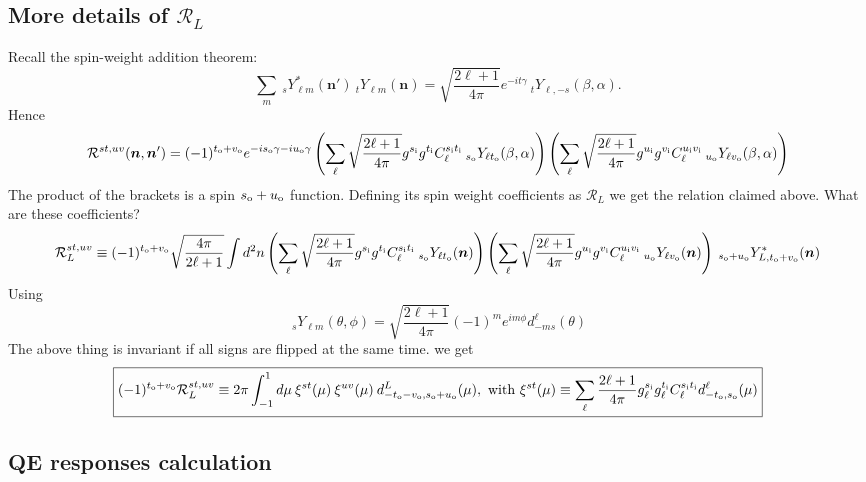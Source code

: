 \documentclass[reprint,prd, superscriptaddress, tightenlines, longbibliography, nofootinbib, eqsecnum, amsfonts, amsmath, floatfix, notitlepage, onecolumn]{revtex4-1}
\newcommand{\si}[0]{{s_{\rm i}}}
\newcommand{\ti}[0]{{t_{\rm i}}}
\newcommand{\ui}[0]{{u_{\rm i}}}
\newcommand{\vi}[0]{{v_{\rm i}}}
\newcommand{\so}[0]{{s_{\rm o}}}
\renewcommand{\to}[0]{{t_{\rm o}}}
\newcommand{\uo}[0]{{u_{\rm o}}}
\newcommand{\vo}[0]{{v_{\rm o}}}
\newcommand{\Ylm}[1]{\:_{#1}Y_{\ell m}}
\newcommand{\Ylms}[1]{\:_{#1}Y^*_{\ell m}}
\newcommand{\hn}[0]{\boldsymbol{n}}
\begin{document}
\subsection*{More details of $\mathcal R_L$}
Recall the spin-weight addition theorem:
\begin{equation}
	\sum_m \Ylms {s}(\hn') \Ylm {t} (\hn) =\sqrt{\frac{2\ell + 1}{4\pi}} e^{- i t \gamma} \:_t Y_{\ell, -s}(\beta, \alpha).
\end{equation}
Hence 
\begin{equation}
	\mathcal R^{st,uv}(\hn, \hn') = (-1)^{\to + \vo} e^{-i \so \gamma -i \uo \gamma} \left(\sum_\ell \sqrt{\frac{2\ell + 1}{4\pi}} g^{\si}g^{\ti} C_\ell^{\si \ti} \:_{\so}Y_{\ell \to}(\beta ,\alpha)\right) \left(\sum_\ell \sqrt{\frac{2\ell + 1}{4\pi}} g^{\ui}g^{\vi} C_\ell^{\ui \vi} \:_{\uo}Y_{\ell \vo}(\beta ,\alpha)\right)
\end{equation}
The product of the brackets is a spin $\so + \uo$ function. Defining its spin weight coefficients as $\mathcal R_L$ we get the relation claimed above. What are these coefficients? 
\begin{equation}
	\mathcal R_L^{st,uv} \equiv(-1)^{\to + \vo} \sqrt{\frac {4\pi}{2\ell + 1}} \int d^2n \left(\sum_\ell \sqrt{\frac{2\ell + 1}{4\pi}} g^{\si}g^{\ti} C_\ell^{\si \ti} \:_{\so}Y_{\ell \to}(\hn)\right) \left(\sum_\ell \sqrt{\frac{2\ell + 1}{4\pi}} g^{\ui}g^{\vi} C_\ell^{\ui \vi} \:_{\uo}Y_{\ell \vo}(\hn)\right)\:_{\so + \uo}Y^*_{L,\to + \vo}(\hn) 
\end{equation}
Using
\begin{equation}
	\boxed{\Ylm s(\theta, \phi) = \sqrt{\frac {2\ell + 1} {4\pi}}(-1)^m e^{i m \phi} d_{-m s}^\ell(\theta) }
\end{equation}
The above thing is invariant if all signs are flipped at the same time.
we get
\begin{equation}
\boxed{
(-1)^{\to + \vo} \mathcal R_L^{st,uv} \equiv 2\pi  \int_{-1}^1 d \mu \:\xi^{st}(\mu)\:\xi^{uv}(\mu)\: d^L_{-\to - \vo, \so + \uo}(\mu),\textrm{  with } \xi^{st}(\mu) \equiv  \sum_\ell \frac{2\ell + 1}{4\pi}g^\si_\ell g^\ti_\ell C_\ell^{\si \ti} d^\ell_{-\to,\so}(\mu)}
 \end{equation}
 \subsection{QE responses calculation}
 
\end{document}
